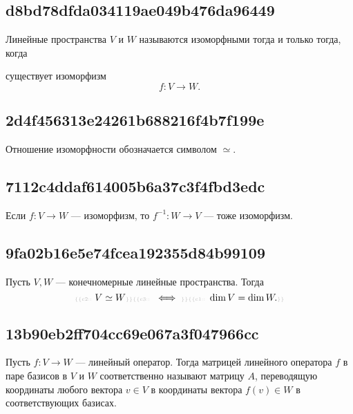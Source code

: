 \documentclass[11pt, a5paper]{article}
\newenvironment{note}[1]{\goodbreak\par\subsection{\hfill \color{lightgray}\tiny #1}}{}
\newenvironment{icloze}[2][\ldots]{%
  \ignorespaces\text{\tiny \color{lightgray} \{\{c#2:: }%
}{%
  \text{\tiny \color{lightgray}\}\}}\unskip%
}
\begin{document}
\begin{note}{d8bd78dfda034119ae049b476da96449}
    Линейные пространства \( V \) и \( W \) называются \begin{icloze}{1}и\-зо\-мор\-фны\-ми\end{icloze} тогда и только тогда, когда \begin{icloze}{1}
        существует изоморфизм
        \[
            f : V \to W.
        \]
    \end{icloze}
\end{note}

\begin{note}{2d4f456313e24261b688216f4b7f199e}
    Отношение \begin{icloze}{2}изоморфности\end{icloze} обозначается символом \begin{icloze}{1}\( \simeq  \). \end{icloze}
\end{note}

\begin{note}{7112c4ddaf614005b6a37c3f4fbd3edc}
    Если \( f : V \to W \) --- изоморфизм, то \( f^{-1} : W \to V \) \begin{icloze}{1}--- тоже изоморфизм.\end{icloze}
\end{note}

\begin{note}{9fa02b16e5e74fcea192355d84b99109}
    Пусть \( V, W \) --- конечномерные линейные пространства. Тогда
    \[
        \begin{icloze}{2}V \simeq W\end{icloze} \begin{icloze}{3}\iff\end{icloze} \begin{icloze}{1}\dim V = \dim W.\end{icloze}
    \]
\end{note}

\begin{note}{13b90eb2ff704cc69e067a3f047966cc}
    Пусть \( f : V \to W \) --- линейный оператор. Тогда \begin{icloze}{2}матрицей линейного оператора \( f \) в паре базисов в \( V \) и \( W \) соответственно\end{icloze} называют \begin{icloze}{1}матрицу \( A \), переводящую координаты любого вектора \( v \in V \) в координаты вектора \( f(v) \in W \) в соответствующих базисах.\end{icloze}
\end{note}
\end{document}

